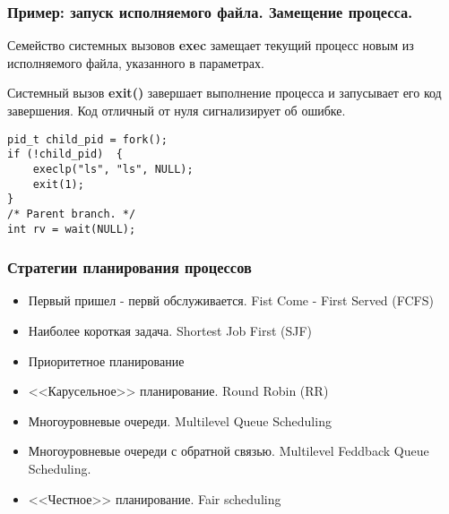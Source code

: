 \documentclass{beamer}
\begin{document}
\begin{frame}[fragile]
    \frametitle{Пример: запуск исполняемого файла. Замещение процесса.}
    Семейство системных вызовов {\bf exec} замещает текущий процесс новым из
    исполняемого файла, указанного в параметрах.

    Системный вызов {\bf exit()} завершает выполнение процесса и запусывает его код завершения. Код отличный от нуля сигнализирует об ошибке.
\begin{verbatim}
pid_t child_pid = fork();
if (!child_pid)  {
    execlp("ls", "ls", NULL);
    exit(1);
} 
/* Parent branch. */
int rv = wait(NULL);
\end{verbatim}

\end{frame}
\begin{frame}
    \frametitle{Стратегии планирования процессов}
    \begin{itemize}
        \item Первый пришел - первй обслуживается. Fist Come - First Served (FCFS)
        \item Наиболее короткая задача. Shortest Job First (SJF)
        \item Приоритетное планирование
        \item <<Карусельное>> планирование. Round Robin (RR)
        \item Многоуровневые очереди. Multilevel Queue Scheduling
        \item Многоуровневые очереди с обратной связью. Multilevel Feddback Queue Scheduling.
        \item <<Честное>> планирование. Fair scheduling
    \end{itemize}
\end{frame}
\end{document}

